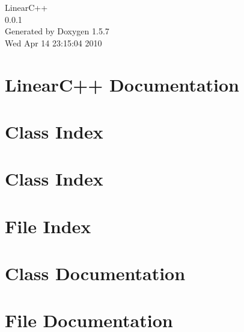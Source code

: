 \documentclass[a4paper]{book}
\begin{document}
\begin{titlepage}
\vspace*{7cm}
\begin{center}
{\Large LinearC++ \\[1ex]\large 0.0.1 }\\
\vspace*{1cm}
{\large Generated by Doxygen 1.5.7}\\
\vspace*{0.5cm}
{\small Wed Apr 14 23:15:04 2010}\\
\end{center}
\end{titlepage}
\clearemptydoublepage
{}
\tableofcontents
\clearemptydoublepage
{}
\chapter{LinearC++ Documentation}
\label{index}\hypertarget{index}{}
\chapter{Class Index}

\chapter{Class Index}

\chapter{File Index}

\chapter{Class Documentation}



\chapter{File Documentation}





\printindex
\end{document}

